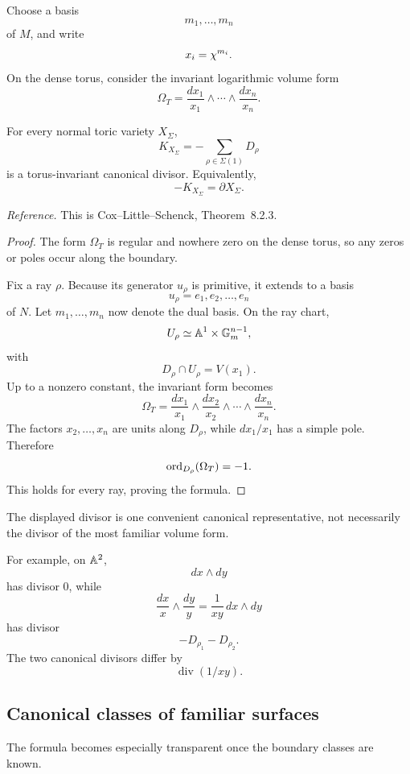 Choose a basis
\[
m_1,\ldots,m_n
\]
of \(M\), and write
\[
x_i=\chi^{m_i}.
\]
On the dense torus, consider the invariant logarithmic volume form
\[
\Omega_T
=
\frac{dx_1}{x_1}\wedge\cdots\wedge\frac{dx_n}{x_n}.
\]

\begin{theorem}
\label{thm:canonical-divisor-toric}
For every normal toric variety \(X_\Sigma\),
\[
\boxed{
K_{X_\Sigma}
=
-\sum_{\rho\in\Sigma(1)}D_\rho
}
\]
is a torus-invariant canonical divisor. Equivalently,
\[
-K_{X_\Sigma}
=
\partial X_\Sigma.
\]
\end{theorem}

\noindent
\textit{Reference.}
This is Cox--Little--Schenck, Theorem~8.2.3.

\begin{proof}
The form \(\Omega_T\) is regular and nowhere zero on the dense torus,
so any zeros or poles occur along the boundary.

Fix a ray \(\rho\). Because its generator \(u_\rho\) is primitive, it
extends to a basis
\[
u_\rho=e_1,e_2,\ldots,e_n
\]
of \(N\). Let \(m_1,\ldots,m_n\) now denote the dual basis. On the ray
chart,
\[
U_\rho
\simeq
\mathbb{A}^1\times\mathbb{G}_{m}^{n-1},
\]
with
\[
D_\rho\cap U_\rho=V(x_1).
\]
Up to a nonzero constant, the invariant form becomes
\[
\Omega_T
=
\frac{dx_1}{x_1}\wedge
\frac{dx_2}{x_2}\wedge\cdots\wedge
\frac{dx_n}{x_n}.
\]
The factors \(x_2,\ldots,x_n\) are units along \(D_\rho\), while
\(dx_1/x_1\) has a simple pole. Therefore
\[
\operatorname{ord}_{D_\rho}(\Omega_T)=-1.
\]
This holds for every ray, proving the formula.
\end{proof}

\begin{observation}
The displayed divisor is one convenient canonical representative,
not necessarily the divisor of the most familiar volume form.

For example, on \(\mathbb{A}^2\),
\[
dx\wedge dy
\]
has divisor \(0\), while
\[
\frac{dx}{x}\wedge\frac{dy}{y}
=
\frac{1}{xy}\,dx\wedge dy
\]
has divisor
\[
-D_{\rho_1}-D_{\rho_2}.
\]
The two canonical divisors differ by
\[
\operatorname{div}(1/xy).
\]
\end{observation}

\subsection{Canonical classes of familiar surfaces}

The formula becomes especially transparent once the boundary classes
are known.

